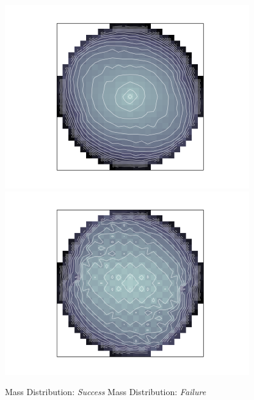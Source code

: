 \documentclass{article}
\begin{document}
\begin{figure}
\centering
\includegraphics[width=300pt]{fig/simsModeling-fig006.png}
\includegraphics[width=300pt]{fig/simsModeling-fig007.png}
\caption{Mass Distribution: {\color{color02} \emph{Success}}
  Mass Distribution: {\color{color02} \emph{Failure}}}
\end{figure}
\end{document}
